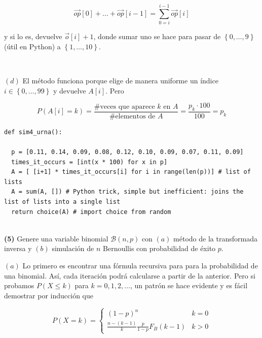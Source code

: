 \documentclass[a4paper, 12pt]{article}
\begin{document}
\begin{equation*}
  \overrightarrow{op}[0] + \ldots + \overrightarrow{op}[i-1] = \sum_{0=i}^{i-1}
  \overrightarrow{op}[i] 
\end{equation*}

y si lo es, devuelve $\overrightarrow{o}[i] + 1$, donde sumar uno se hace para
pasar de $\left\{ 0,\ldots,9 \right\} $ (útil en Python) a $\left\{ 1, \ldots,
10 \right\} $.

~

$(d)$ El método funciona porque elige de manera uniforme un índice $i \in
\left\{ 0, \ldots, 99 \right\} $ y devuelve $A[i]$. Pero 

\begin{equation*}
  P(A[i] = k) = \frac{\text{\# veces que aparece } k \text{ en }
  A}{\#\text{elementos de } A} = \frac{p_k \cdot 100}{100} = p_k
\end{equation*}

\begin{verbatim}
def sim4_urna():

  p = [0.11, 0.14, 0.09, 0.08, 0.12, 0.10, 0.09, 0.07, 0.11, 0.09]
  times_it_occurs = [int(x * 100) for x in p]
  A = [ [i+1] * times_it_occurs[i] for i in range(len(p))] # list of lists 
  A = sum(A, []) # Python trick, simple but inefficient: joins the list of lists into a single list
  return choice(A) # import choice from random
  
\end{verbatim}

\pagebreak

\begin{myframe}
  \textbf{(5)} Genere una variable binomial $\mathcal{B}(n, p)$ con $(a)$ método de la
  transformada inversa y $(b)$ simulación de $n$ Bernoullis con probabilidad de
  éxito $p$.
\end{myframe}

$(a)$ Lo primero es encontrar una fórmula recursiva para para la probabilidad de una
binomial. Así, cada iteración podrá calcularse a partir de la anterior. Pero si
probamos $P(X \leq k)$ para $k = 0, 1, 2,\ldots$, un patrón se hace evidente y
es fácil demostrar por inducción que

\begin{equation*}
  P(X = k) = \begin{cases}
    (1-p)^n & k = 0 \\
    \frac{n-(k-1)}{k} \frac{p}{1-p} F_B(k-1) & k > 0
  \end{cases}
\end{equation*}
\end{document}
